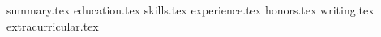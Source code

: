 \documentclass[11pt, a4paper]{awesome-cv}
\newcommand*{\sectiondir}{cv/}
\begin{document}
\makecvheader

{summary.tex}
{education.tex}
{skills.tex}
{experience.tex}
{honors.tex}
{writing.tex}
{extracurricular.tex}
\end{document}
